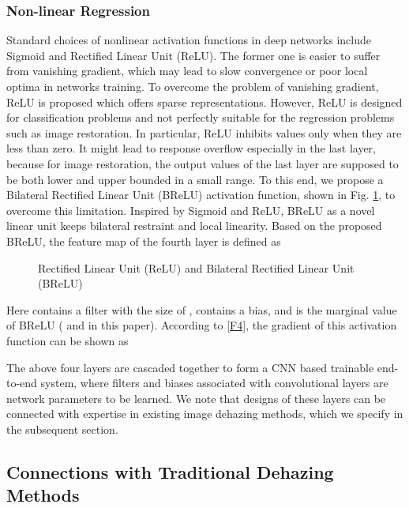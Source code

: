 \documentclass[journal]{IEEEtran}
\begin{document}
\subsubsection{Non-linear Regression}
Standard choices of nonlinear activation functions in deep networks include Sigmoid \cite{function} and Rectified Linear Unit (ReLU). The former one is easier to suffer from vanishing gradient, which may lead to slow convergence or poor local optima in networks training. To overcome the problem of vanishing gradient, ReLU is proposed \cite{relu} which offers sparse representations. However, ReLU is designed for classification problems and not perfectly suitable for the regression problems such as image restoration. In particular, ReLU inhibits values only when they are less than zero. It might lead to response overflow especially in the last layer, because for image restoration, the output values of the last layer are supposed to be both lower and upper bounded in a small range.  To this end, we propose a Bilateral Rectified Linear Unit (BReLU) activation function, shown in Fig. \ref{fig:drelu}, to overcome this limitation. Inspired by Sigmoid and ReLU, BReLU as a novel linear unit keeps bilateral restraint and local linearity. Based on the proposed BReLU, the feature map of the fourth layer is defined as
\begin{figure}[!t]
\centering
{}
\caption{Rectified Linear Unit (ReLU) and Bilateral Rectified Linear Unit (BReLU)}
\label{fig:drelu}
\end{figure}

Here  contains a filter with the size of ,  contains a bias, and  is the marginal value of BReLU ( and  in this paper). According to \eqref{F4}, the gradient of this activation function can be shown as


The above four layers are cascaded together to form a CNN based trainable end-to-end system, where filters and biases associated with convolutional layers are network parameters to be learned. We note that designs of these layers can be connected with expertise in existing image dehazing methods, which we specify in the subsequent section.

\subsection{Connections with Traditional Dehazing Methods}\label{sec:relationship}
\end{document}
